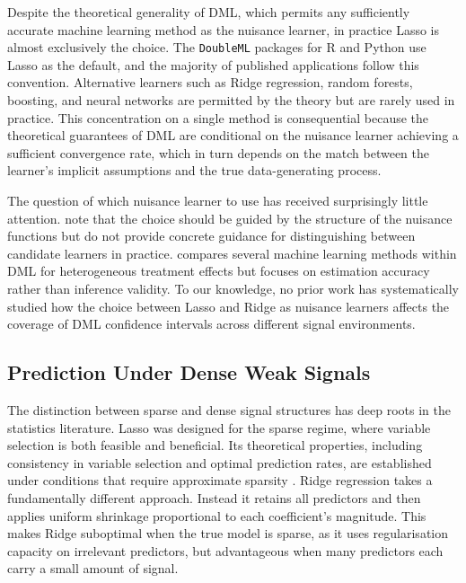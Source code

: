 \documentclass[a4paper,10.5pt]{article}
\begin{document}
Despite the theoretical generality of DML, which permits any sufficiently accurate machine learning method as the nuisance learner, in practice Lasso is almost exclusively the choice. The \texttt{DoubleML} packages for R \citep{bach2022} and Python use Lasso as the default, and the majority of published applications follow this convention. Alternative learners such as Ridge regression, random forests, boosting, and neural networks are permitted by the theory but are rarely used in practice. This concentration on a single method is consequential because the theoretical guarantees of DML are conditional on the nuisance learner achieving a sufficient convergence rate, which in turn depends on the match between the learner's implicit assumptions and the true data-generating process.

The question of which nuisance learner to use has received surprisingly little attention. \citet{chernozhukov2018} note that the choice should be guided by the structure of the nuisance functions but do not provide concrete guidance for distinguishing between candidate learners in practice. \citet{knaus2021} compares several machine learning methods within DML for heterogeneous treatment effects but focuses on estimation accuracy rather than inference validity. To our knowledge, no prior work has systematically studied how the choice between Lasso and Ridge as nuisance learners affects the coverage of DML confidence intervals across different signal environments.


\subsection{Prediction Under Dense Weak Signals}\label{sec:lit_prediction}

The distinction between sparse and dense signal structures has deep roots in the statistics literature. Lasso \citep{tibshirani1996} was designed for the sparse regime, where variable selection is both feasible and beneficial. Its theoretical properties, including consistency in variable selection and optimal prediction rates, are established under conditions that require approximate sparsity \citep{buhlmann2011, bickel2009}. Ridge regression \citep{hoerl1970} takes a fundamentally different approach. Instead it retains all predictors and then applies uniform shrinkage proportional to each coefficient's magnitude. This makes Ridge suboptimal when the true model is sparse, as it uses regularisation capacity on irrelevant predictors, but advantageous when many predictors each carry a small amount of signal.
\end{document}
